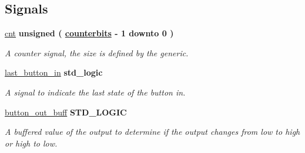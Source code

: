 \subsection*{Signals}
 \begin{DoxyCompactItemize}
\item 
\hypertarget{classbounce__filter_1_1filter__bounce_a91ed0cb5ab66576a11c5a2a0de9a88af}{\hyperlink{classbounce__filter_1_1filter__bounce_a91ed0cb5ab66576a11c5a2a0de9a88af}{cnt} {\bfseries \textcolor{comment}{unsigned}\textcolor{vhdlchar}{ }\textcolor{vhdlchar}{(}\textcolor{vhdlchar}{ }\textcolor{vhdlchar}{ }{\bfseries \hyperlink{classbounce__filter_a5df2a2aceb759129bf8abccdc30aec13}{counterbits}} \textcolor{vhdlchar}{ }\textcolor{vhdlchar}{-\/}\textcolor{vhdlchar}{ } \textcolor{vhdldigit}{1} \textcolor{vhdlchar}{ }\textcolor{vhdlchar}{ }\textcolor{vhdlchar}{ }\textcolor{vhdlkeyword}{downto}\textcolor{vhdlchar}{ }\textcolor{vhdlchar}{ }\textcolor{vhdlchar}{ } \textcolor{vhdldigit}{0} \textcolor{vhdlchar}{ }\textcolor{vhdlchar}{)}\textcolor{vhdlchar}{ }} }\label{classbounce__filter_1_1filter__bounce_a91ed0cb5ab66576a11c5a2a0de9a88af}

\begin{DoxyCompactList}\small\item\em A counter signal, the size is defined by the generic. \end{DoxyCompactList}\item 
\hypertarget{classbounce__filter_1_1filter__bounce_af1b9cebedbee1076cdea82a2084c53d7}{\hyperlink{classbounce__filter_1_1filter__bounce_af1b9cebedbee1076cdea82a2084c53d7}{last\-\_\-button\-\_\-in} {\bfseries \textcolor{comment}{std\-\_\-logic}\textcolor{vhdlchar}{ }} }\label{classbounce__filter_1_1filter__bounce_af1b9cebedbee1076cdea82a2084c53d7}

\begin{DoxyCompactList}\small\item\em A signal to indicate the last state of the button in. \end{DoxyCompactList}\item 
\hypertarget{classbounce__filter_1_1filter__bounce_a42b551e04fcfc5a7c7ec2b57a2879dc0}{\hyperlink{classbounce__filter_1_1filter__bounce_a42b551e04fcfc5a7c7ec2b57a2879dc0}{button\-\_\-out\-\_\-buff} {\bfseries \textcolor{comment}{S\-T\-D\-\_\-\-L\-O\-G\-I\-C}\textcolor{vhdlchar}{ }} }\label{classbounce__filter_1_1filter__bounce_a42b551e04fcfc5a7c7ec2b57a2879dc0}

\begin{DoxyCompactList}\small\item\em A buffered value of the output to determine if the output changes from low to high or high to low. \end{DoxyCompactList}\end{DoxyCompactItemize}


